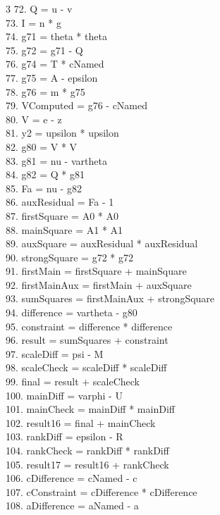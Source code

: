 \documentclass[10pt]{article}
\begin{document}
\begin{multicols}{3}
72. Q = u - v\\
73. I = n * g\\
74. g71 = theta * theta\\
75. g72 = g71 - Q\\
76. g74 = T * cNamed\\
77. g75 = A - epsilon\\
78. g76 = m * g75\\
79. VComputed = g76 - cNamed\\
80. V = e - z\\
81. y2 = upsilon * upsilon\\
82. g80 = V * V\\
83. g81 = nu - vartheta\\
84. g82 = Q * g81\\
85. Fa = nu - g82\\
86. auxResidual = Fa - 1\\
87. firstSquare = A0 * A0\\
88. mainSquare = A1 * A1\\
89. auxSquare = auxResidual * auxResidual\\
90. strongSquare = g72 * g72\\
91. firstMain = firstSquare + mainSquare\\
92. firstMainAux = firstMain + auxSquare\\
93. sumSquares = firstMainAux + strongSquare\\
94. difference = vartheta - g80\\
95. constraint = difference * difference\\
96. result = sumSquares + constraint\\
97. scaleDiff = psi - M\\
98. scaleCheck = scaleDiff * scaleDiff\\
99. final = result + scaleCheck\\
100. mainDiff = varphi - U\\
101. mainCheck = mainDiff * mainDiff\\
102. result16 = final + mainCheck\\
103. rankDiff = epsilon - R\\
104. rankCheck = rankDiff * rankDiff\\
105. result17 = result16 + rankCheck\\
106. cDifference = cNamed - c\\
107. cConstraint = cDifference * cDifference\\
108. aDifference = aNamed - a\\

\end{multicols}
\end{document}
